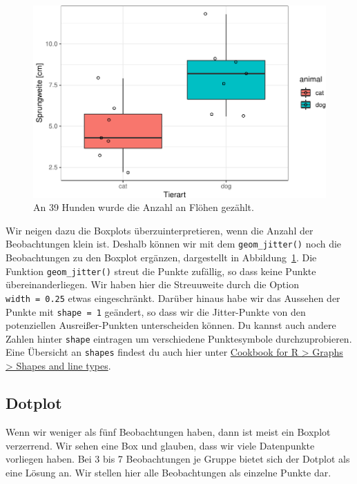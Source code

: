 \documentclass[
  letterpaper,
  DIV=11,
  oneside]{scrreport}
\begin{document}
\begin{figure}[H]

{\centering \includegraphics{./eda-ggplot_files/figure-pdf/fig-boxplot-freshmatter-2-1.pdf}

}

\caption{\label{fig-boxplot-freshmatter-2}An 39 Hunden wurde die Anzahl
an Flöhen gezählt.}

\end{figure}

Wir neigen dazu die Boxplots überzuinterpretieren, wenn die Anzahl der
Beobachtungen klein ist. Deshalb können wir mit dem
\texttt{geom\_jitter()} noch die Beobachtungen zu den Boxplot ergänzen,
dargestellt in Abbildung~\ref{fig-boxplot-freshmatter-2}. Die Funktion
\texttt{geom\_jitter()} streut die Punkte zufällig, so dass keine Punkte
übereinanderliegen. Wir haben hier die Streuuweite durch die Option
\texttt{width\ =\ 0.25} etwas eingeschränkt. Darüber hinaus habe wir das
Aussehen der Punkte mit \texttt{shape\ =\ 1} geändert, so dass wir die
Jitter-Punkte von den potenziellen Ausreißer-Punkten unterscheiden
können. Du kannst auch andere Zahlen hinter \texttt{shape} eintragen um
verschiedene Punktesymbole durchzuprobieren. Eine Übersicht an
\texttt{shapes} findest du auch hier unter
\href{http://www.cookbook-r.com/Graphs/Shapes_and_line_types/}{Cookbook
for R \textgreater{} Graphs \textgreater{} Shapes and line types}.

\hypertarget{sec-eda-dotplot}{%
\subsection{Dotplot}\label{sec-eda-dotplot}}

Wenn wir weniger als fünf Beobachtungen haben, dann ist meist ein
Boxplot verzerrend. Wir sehen eine Box und glauben, dass wir viele
Datenpunkte vorliegen haben. Bei 3 bis 7 Beobachtungen je Gruppe bietet
sich der Dotplot als eine Lösung an. Wir stellen hier alle Beobachtungen
als einzelne Punkte dar.
\end{document}
